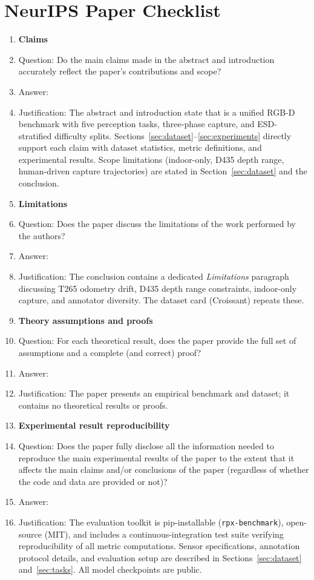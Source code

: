 \section*{NeurIPS Paper Checklist}

\begin{enumerate}

\item {\bf Claims}
    \item[] Question: Do the main claims made in the abstract and introduction accurately reflect the paper's contributions and scope?
    \item[] Answer: \answerYes{}
    \item[] Justification: The abstract and introduction state that \coolname{} is a unified RGB-D benchmark with five perception tasks, three-phase capture, and ESD-stratified difficulty splits. Sections~\ref{sec:dataset}--\ref{sec:experiments} directly support each claim with dataset statistics, metric definitions, and experimental results. Scope limitations (indoor-only, D435 depth range, human-driven capture trajectories) are stated in Section~\ref{sec:dataset} and the conclusion.

\item {\bf Limitations}
    \item[] Question: Does the paper discuss the limitations of the work performed by the authors?
    \item[] Answer: \answerYes{}
    \item[] Justification: The conclusion contains a dedicated \emph{Limitations} paragraph discussing T265 odometry drift, D435 depth range constraints, indoor-only capture, and annotator diversity. The dataset card (Croissant) repeats these.

\item {\bf Theory assumptions and proofs}
    \item[] Question: For each theoretical result, does the paper provide the full set of assumptions and a complete (and correct) proof?
    \item[] Answer: \answerNA{}
    \item[] Justification: The paper presents an empirical benchmark and dataset; it contains no theoretical results or proofs.

    \item {\bf Experimental result reproducibility}
    \item[] Question: Does the paper fully disclose all the information needed to reproduce the main experimental results of the paper to the extent that it affects the main claims and/or conclusions of the paper (regardless of whether the code and data are provided or not)?
    \item[] Answer: \answerYes{}
    \item[] Justification: The evaluation toolkit is pip-installable (\texttt{rpx-benchmark}), open-source (MIT), and includes a continuous-integration test suite verifying reproducibility of all metric computations. Sensor specifications, annotation protocol details, and evaluation setup are described in Sections~\ref{sec:dataset} and~\ref{sec:tasks}. All model checkpoints are public.


\end{enumerate}

